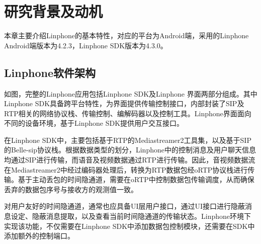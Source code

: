 \section{研究背景及动机}
\label{chap:linphone:motivation}

本章主要介绍Linphone的基本特性，对应的平台为Android端，采用的Linphone Android端版本为4.2.3，Linphone SDK版本为4.3.0。

\subsection{Linphone软件架构}
\label{chap:linphone:motivation:struct}


如图，完整的Linphone应用包括Linphone SDK及Linphone 界面两部分组成。其中Linphone SDK具备跨平台特性，为界面提供传输控制接口，内部封装了SIP及RTP相关的网络协议栈、传输控制、编解码器以及控制工具。Linphone界面面向不同的设备环境，基于Linphone SDK提供用户交互接口。

在Linphone SDK中，主要包括基于RTP的Mediastreamer2工具集，以及基于SIP的Belle-sip协议栈。根据数据类型的划分，Linphone中的控制消息及用户聊天信息均通过SIP进行传输，而语音及视频数据通过RTP进行传输。因此，音视频数据流在Mediastreamer2中经过编码器处理后，转换为RTP数据包经oRTP协议栈进行传输。基于主动丢包的时间隐通道，需要在oRTP中控制数据包传输调度，从而确保丢弃的数据包序号与接收方的观测值一致。

对用户友好的时间隐通道，通常也应具备UI层用户接口，通过UI接口进行隐蔽消息设定、隐蔽消息提取，以及查看当前时间隐通道的传输状态。Linphone环境下实现该功能，不仅需要在Linphone SDK中添加数据包控制模块，还需要在SDK中添加额外的控制端口。

